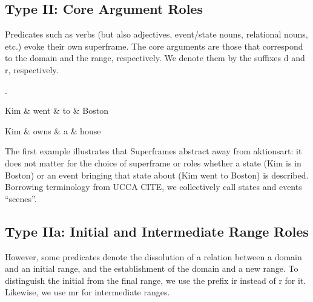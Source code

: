 \documentclass[a4paper]{article}
\begin{document}
\subsection{Type II: Core Argument Roles}

Predicates such as verbs (but also adjectives, event/state nouns, relational nouns, etc.) evoke their own superframe. The core arguments are those that correspond to the domain and the range, respectively. We denote them by the suffixes \textsf{d} and \textsf{r}, respectively.

\ex.
\begin{dependency}
  \begin{deptext}
    Kim \& went \& to \& Boston \\
  \end{deptext}
\end{dependency}
\begin{dependency}
  \begin{deptext}
    Kim \& owns \& a \& house \\
  \end{deptext}
\end{dependency}

The first example illustrates that Superframes abstract away from aktionsart: it does not matter for the choice of superframe or roles whether a state (Kim is in Boston) or an event bringing that state about (Kim went to Boston) is described. Borrowing terminology from UCCA CITE, we collectively call states and events ``scenes''.

\subsection{Type IIa: Initial and Intermediate Range Roles}

However, some predicates denote the dissolution of a relation between a domain and an initial range, and the establishment of the domain and a new range. To distinguish the initial from the final range, we use the prefix \textsf{ir} instead of \textsf{r} for it. Likewise, we use \textsf{mr} for intermediate ranges.
\end{document}
